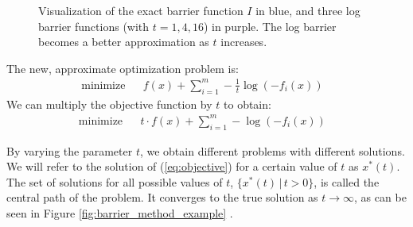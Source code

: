 \documentclass[12pt, a4paper]{report}
\begin{document}
\begin{figure}
    \centering
    \caption{Visualization of the exact barrier function $I$ in blue, and three log barrier functions (with $t=1,4,16$) in purple. The log barrier becomes a better approximation as $t$ increases.}
    \label{fig:logbarrier}
\end{figure}

The new, approximate optimization problem is:
\begin{align}
    &\textrm{minimize} && f(x) + \sum_{i=1}^m -\frac{1}{t}\log(-f_i(x))&&
    \label{eq:barrierproblem}
\end{align}
We can multiply the objective function by $t$ to obtain:
\begin{align}
    &\textrm{minimize} && t \cdot f(x) + \sum_{i=1}^m -\log(-f_i(x))&&
    \label{eq:objective}
\end{align}

By varying the parameter $t$, we obtain different problems with different solutions.
We will refer to the solution of (\ref{eq:objective}) for a certain value of $t$ as $x^*(t)$.
The set of solutions for all possible values of $t$, $\{x^*(t) \,|\, t > 0\}$, is called the central path of the problem.
It converges to the true solution as $t \rightarrow \infty$, as can be seen in Figure \ref{fig:barrier_method_example} \cite[564]{boyd}.
\end{document}
